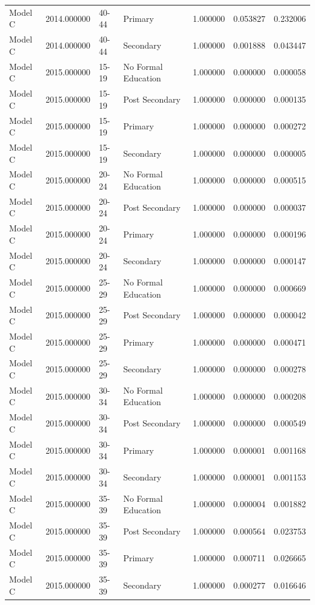 \begin{table}[ht]
\begin{tabular}{lrllrrr}
Model C & 2014.000000 & 40-44 & Primary & 1.000000 & 0.053827 & 0.232006 \\
Model C & 2014.000000 & 40-44 & Secondary & 1.000000 & 0.001888 & 0.043447 \\
Model C & 2015.000000 & 15-19 & No Formal Education & 1.000000 & 0.000000 & 0.000058 \\
Model C & 2015.000000 & 15-19 & Post Secondary & 1.000000 & 0.000000 & 0.000135 \\
Model C & 2015.000000 & 15-19 & Primary & 1.000000 & 0.000000 & 0.000272 \\
Model C & 2015.000000 & 15-19 & Secondary & 1.000000 & 0.000000 & 0.000005 \\
Model C & 2015.000000 & 20-24 & No Formal Education & 1.000000 & 0.000000 & 0.000515 \\
Model C & 2015.000000 & 20-24 & Post Secondary & 1.000000 & 0.000000 & 0.000037 \\
Model C & 2015.000000 & 20-24 & Primary & 1.000000 & 0.000000 & 0.000196 \\
Model C & 2015.000000 & 20-24 & Secondary & 1.000000 & 0.000000 & 0.000147 \\
Model C & 2015.000000 & 25-29 & No Formal Education & 1.000000 & 0.000000 & 0.000669 \\
Model C & 2015.000000 & 25-29 & Post Secondary & 1.000000 & 0.000000 & 0.000042 \\
Model C & 2015.000000 & 25-29 & Primary & 1.000000 & 0.000000 & 0.000471 \\
Model C & 2015.000000 & 25-29 & Secondary & 1.000000 & 0.000000 & 0.000278 \\
Model C & 2015.000000 & 30-34 & No Formal Education & 1.000000 & 0.000000 & 0.000208 \\
Model C & 2015.000000 & 30-34 & Post Secondary & 1.000000 & 0.000000 & 0.000549 \\
Model C & 2015.000000 & 30-34 & Primary & 1.000000 & 0.000001 & 0.001168 \\
Model C & 2015.000000 & 30-34 & Secondary & 1.000000 & 0.000001 & 0.001153 \\
Model C & 2015.000000 & 35-39 & No Formal Education & 1.000000 & 0.000004 & 0.001882 \\
Model C & 2015.000000 & 35-39 & Post Secondary & 1.000000 & 0.000564 & 0.023753 \\
Model C & 2015.000000 & 35-39 & Primary & 1.000000 & 0.000711 & 0.026665 \\
Model C & 2015.000000 & 35-39 & Secondary & 1.000000 & 0.000277 & 0.016646 \\

\end{tabular}
\end{table}

